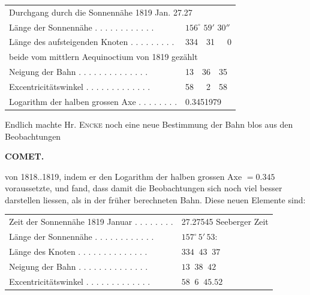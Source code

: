 \begin{center}
\begin{tabular}{l l}
\multicolumn{2}{l}{Durchgang durch die Sonnennähe 1819 Jan. 27.27} \\
Länge der Sonnennähe . . . . . . . . . . . . & $156^\circ$ $59'$ $30''$ \\
Länge des aufsteigenden Knoten . . . . . . . . . & 334\ \ 31\ \ \ 0 \\
\multicolumn{2}{l}{\quad beide vom mittlern Aequinoctium von 1819 gezählt} \\
Neigung der Bahn . . . . . . . . . . . . . . & 13\ \ 36\ \ 35 \\
Excentricitätswinkel . . . . . . . . . . . . . & 58\ \ \ 2\ \ 58 \\
Logarithm der halben grossen Axe . . . . . . . . & 0.3451979 \\
\end{tabular}
\end{center}

\par\indent Endlich machte Hr. \textsc{Encke} noch eine neue Bestimmung der Bahn blos aus den Beobachtungen\par
\clearpage
\thispagestyle{empty}
\noindent{}%
\makebox[12mm][l]{}%
\parbox[t]{\dimexpr\linewidth-24mm\relax}{\centering\footnotesize\bfseries COMET.\par}%
\par\nobreak\medskip
\noindent von 1818..1819, indem er den Logarithm der halben grossen Axe $= 0.345$ voraussetzte, und fand, dass
damit die Beobachtungen sich noch viel besser darstellen liessen, als in der früher berechneten Bahn.
Diese neuen Elemente sind:

\begin{center}
\begin{tabular}{l l}
Zeit der Sonnennähe 1819 Januar . . . . . . . . & 27.27545 Seeberger Zeit \\
Länge der Sonnennähe . . . . . . . . . . . . & $157^\circ\,5'\,53$: \\ 
Länge des Knoten . . . . . . . . . . . . . . & $334\;\;43\;\;37$ \\
Neigung der Bahn . . . . . . . . . . . . . . & $13\;\;38\;\;42$ \\
Excentricitätswinkel . . . . . . . . . . . . . & $58\;\;6\;\;45.52$ \\
\end{tabular}
\end{center}

